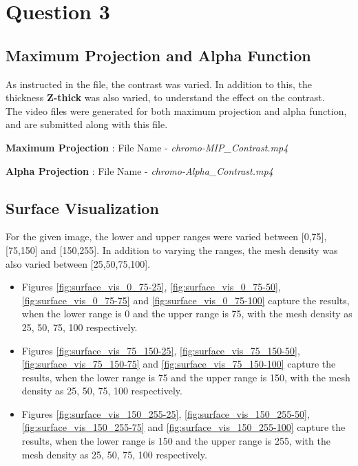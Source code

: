 \documentclass{article}
\begin{document}
\clearpage
\section*{Question 3}
\subsection*{Maximum Projection and Alpha Function}
As instructed in the file, the contrast was varied. In addition to this, the thickness \textbf{Z-thick} was also varied, to understand the effect on the contrast. \\The video files were generated for both maximum projection and alpha function, and are submitted along with this file. 

\medskip

\textbf{Maximum Projection} : File Name - \textit{chromo-MIP\_Contrast.mp4}

\textbf{Alpha Projection} : File Name - \textit{chromo-Alpha\_Contrast.mp4}
\subsection*{Surface Visualization}
For the given image, the lower and upper ranges were varied between [0,75], [75,150] and [150,255]. In addition to varying the ranges, the mesh density was also varied between [25,50,75,100].
\begin{itemize}
    \item Figures \ref{fig:surface_vis_0_75-25}, \ref{fig:surface_vis_0_75-50}, \ref{fig:surface_vis_0_75-75} and \ref{fig:surface_vis_0_75-100} capture the results, when the lower range is 0 and the upper range is 75, with the mesh density as 25, 50, 75, 100 respectively. 
    \item Figures \ref{fig:surface_vis_75_150-25}, \ref{fig:surface_vis_75_150-50}, \ref{fig:surface_vis_75_150-75} and \ref{fig:surface_vis_75_150-100} capture the results, when the lower range is 75 and the upper range is 150, with the mesh density as 25, 50, 75, 100 respectively.
    \item Figures \ref{fig:surface_vis_150_255-25}, \ref{fig:surface_vis_150_255-50}, \ref{fig:surface_vis_150_255-75} and \ref{fig:surface_vis_150_255-100} capture the results, when the lower range is 150 and the upper range is 255, with the mesh density as 25, 50, 75, 100 respectively. 
\end{itemize}
\end{document}
